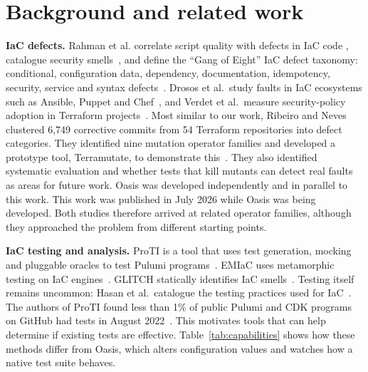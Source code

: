 \documentclass[3p,times,procedia]{elsarticle}
\begin{document}
\section{Background and related work}\label{sec:related}
\textbf{IaC defects.} Rahman et al. correlate script quality with defects in IaC code \cite{rahman}, catalogue security smells~\cite{seven}, and define the ``Gang of Eight'' IaC defect taxonomy: conditional, configuration data, dependency, documentation, idempotency, security, service and syntax defects~\cite{gangofeight}. Drosos et al.\ study faults in IaC ecosystems such as Ansible, Puppet and Chef~\cite{drosos}, and Verdet et al.\ measure security-policy adoption in Terraform projects~\cite{verdet}. Most similar to our work, Ribeiro and Neves clustered 6,749 corrective commits from 54 Terraform repositories into defect categories. They identified nine mutation operator families and developed a prototype tool, Terramutate, to demonstrate this~\cite{ribeiro}. They also identified systematic evaluation and whether tests that kill mutants can detect real faults as areas for future work. Oasis was developed independently and in parallel to this work. This work was published in July 2026 while Oasis was being developed. Both studies therefore arrived at related operator families, although they approached the problem from different starting points.


\textbf{IaC testing and analysis.} ProTI is a tool that uses test generation, mocking and pluggable oracles to test Pulumi programs~\cite{proti}. EMIaC uses metamorphic testing on IaC engines~\cite{emiac}. GLITCH statically identifies IaC smells~\cite{glitch,glitchdemo}. Testing itself remains uncommon: Hasan et al.\ catalogue the testing practices used for IaC~\cite{hasan}. The authors of ProTI found less than 1\% of public Pulumi and CDK programs on GitHub had tests in August 2022~\cite{proti}. This motivates tools that can help determine if existing tests are effective. Table~\ref{tab:capabilities} shows how these methods differ from Oasis, which alters configuration values and watches how a native test suite behaves.
\end{document}
